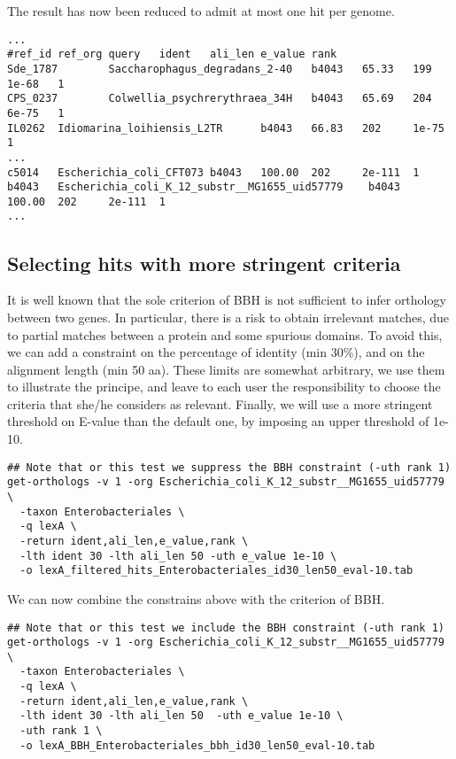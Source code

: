 The result has now been reduced to admit at most one hit per genome.

\begin{scriptsize}
\begin{verbatim}
...
#ref_id ref_org query   ident   ali_len e_value rank
Sde_1787        Saccharophagus_degradans_2-40   b4043   65.33   199     1e-68   1
CPS_0237        Colwellia_psychrerythraea_34H   b4043   65.69   204     6e-75   1
IL0262  Idiomarina_loihiensis_L2TR      b4043   66.83   202     1e-75   1
...
c5014   Escherichia_coli_CFT073 b4043   100.00  202     2e-111  1
b4043   Escherichia_coli_K_12_substr__MG1655_uid57779    b4043   100.00  202     2e-111  1
...
\end{verbatim}
\end{scriptsize}

\subsection{Selecting hits with more stringent criteria}

It is well known that the sole criterion of BBH is not sufficient to
infer orthology between two genes. In particular, there is a risk to
obtain irrelevant matches, due to partial matches between a protein
and some spurious domains. To avoid this, we can add a constraint on
the percentage of identity (min 30\%), and on the alignment length
(min 50 aa). These limits are somewhat arbitrary, we use them to
illustrate the principe, and leave to each user the responsibility to
choose the criteria that she/he considers as relevant. Finally, we
will use a more stringent threshold on E-value than the default one,
by imposing an upper threshold of 1e-10.

\begin{footnotesize}
\begin{verbatim}
## Note that or this test we suppress the BBH constraint (-uth rank 1)
get-orthologs -v 1 -org Escherichia_coli_K_12_substr__MG1655_uid57779 \
  -taxon Enterobacteriales \
  -q lexA \
  -return ident,ali_len,e_value,rank \
  -lth ident 30 -lth ali_len 50 -uth e_value 1e-10 \
  -o lexA_filtered_hits_Enterobacteriales_id30_len50_eval-10.tab
\end{verbatim}
\end{footnotesize}

We can now combine the constrains above with the criterion of BBH.

\begin{footnotesize}
\begin{verbatim}
## Note that or this test we include the BBH constraint (-uth rank 1)
get-orthologs -v 1 -org Escherichia_coli_K_12_substr__MG1655_uid57779 \
  -taxon Enterobacteriales \
  -q lexA \
  -return ident,ali_len,e_value,rank \
  -lth ident 30 -lth ali_len 50  -uth e_value 1e-10 \
  -uth rank 1 \
  -o lexA_BBH_Enterobacteriales_bbh_id30_len50_eval-10.tab
\end{verbatim}
\end{footnotesize}

